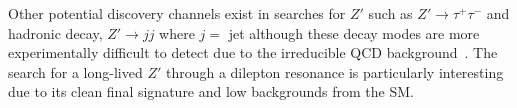 Other potential discovery channels exist in searches for $Z'$ such as $Z' \rightarrow \tau^{+}\tau^{-}$ and hadronic decay, $Z' \rightarrow jj$ where $j =$ jet although these decay modes are more experimentally difficult to detect due to the irreducible QCD background~\cite{Aaboud:2017yvp,Sirunyan:2016iap}. The search for a long-lived $Z'$ through a dilepton resonance is particularly interesting due to its clean final signature and low backgrounds from the SM.

